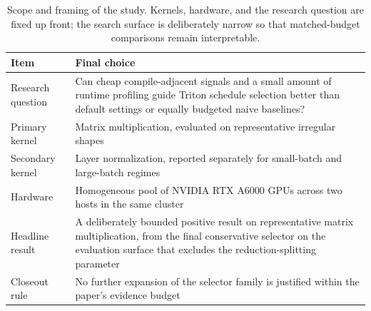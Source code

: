 \begin{table}[t]
\centering
\small
\begin{tabular}{p{}p{}}
\toprule
Item & Final choice \\
\midrule
Research question & Can cheap compile-adjacent signals and a small amount of runtime profiling guide Triton schedule selection better than default settings or equally budgeted naive baselines? \\
Primary kernel & Matrix multiplication, evaluated on representative irregular shapes \\
Secondary kernel & Layer normalization, reported separately for small-batch and large-batch regimes \\
Hardware & Homogeneous pool of NVIDIA RTX A6000 GPUs across two hosts in the same cluster \\
Headline result & A deliberately bounded positive result on representative matrix multiplication, from the final conservative selector on the evaluation surface that excludes the reduction-splitting parameter \\
Closeout rule & No further expansion of the selector family is justified within the paper's evidence budget \\
\bottomrule
\end{tabular}
\caption{Scope and framing of the study. Kernels, hardware, and the research question are fixed up front; the search surface is deliberately narrow so that matched-budget comparisons remain interpretable.}
\label{tab:scope}
\end{table}
